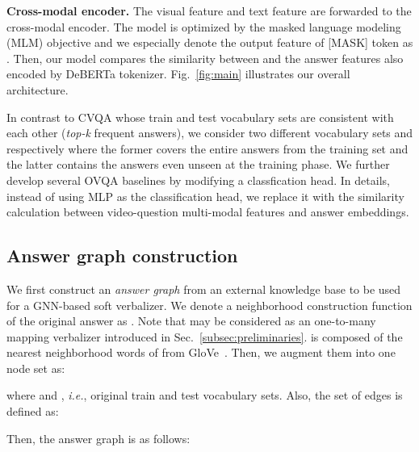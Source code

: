 \documentclass[10pt,twocolumn,letterpaper]{article}
\begin{document}
\noindent \textbf{Cross-modal encoder.}
The visual feature  and text feature  are forwarded to the cross-modal encoder.
The model is optimized by the masked language modeling (MLM) objective and we especially denote the output feature of [MASK] token as .
Then, our model compares the similarity between  and the answer features also encoded by DeBERTa tokenizer.
Fig.~\ref{fig:main} illustrates our overall architecture.

In contrast to CVQA whose train and test vocabulary sets are consistent with each other (\textit{top-k} frequent answers), we consider two different vocabulary sets  and  respectively where the former covers the entire answers from the training set and the latter contains the answers even unseen at the training phase.
We further develop several OVQA baselines by modifying a classfication head.
In details, instead of using MLP as the classification head, we replace it with the similarity calculation between video-question multi-modal features and answer embeddings. \subsection{Answer graph construction}

We first construct an \textit{answer graph} from an external knowledge base to be used for a GNN-based soft verbalizer.
We denote a neighborhood construction function of the original answer  as .
Note that  may be considered as an one-to-many mapping verbalizer introduced in Sec.~\ref{subsec:preliminaries}.
 is composed of the nearest neighborhood words of  from GloVe~\cite{pennington2014glove}.
Then, we augment them into one node set as:

where  and , \textit{i.e.}, original train and test vocabulary sets.
Also, the set of edges is defined as:

Then, the answer graph is as follows:
\end{document}
